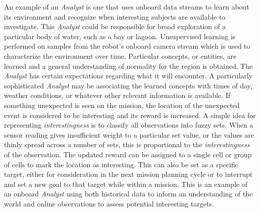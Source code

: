 \documentclass{tamuccthesis}
\begin{document}
An example of an \textit{Analyst} is one that uses onboard data streams to learn about its environment and recognize when interesting subjects are available to investigate. This \textit{Analyst} could be responsible for broad exploration of a particular body of water, such as a bay or lagoon. Unsupervised learning is performed on samples from the robot's onboard camera stream which is used to characterize the environment over time. Particular concepts, or entities, are learned and a general understanding of normality for the region is obtained. The \textit{Analyst} has certain expectations regarding what it will encounter. A particularly sophisticated \textit{Analyst} may be associating the learned concepts with times of day, weather conditions, or whatever other relevant information is available. If something unexpected is seen on the mission, the location of the unexpected event is considered to be interesting and its reward is increased. A simple idea for representing \textit{interestingness} is to classify all observations into fuzzy sets. When a sensor reading gives insufficient weight to a particular set value, or the values are thinly spread across a number of sets, this is proportional to the \textit{interestingness} of the observation. The updated reward can be assigned to a single cell or group of cells to mark the location as interesting. This can also be set as a specific target, either for consideration in the next mission planning cycle or to interrupt and set a new goal to that target while within a mission. This is an example of an onboard \textit{Analyst} using both historical data to inform an understanding of the world and online observations to assess potential interesting targets. 
\end{document}
